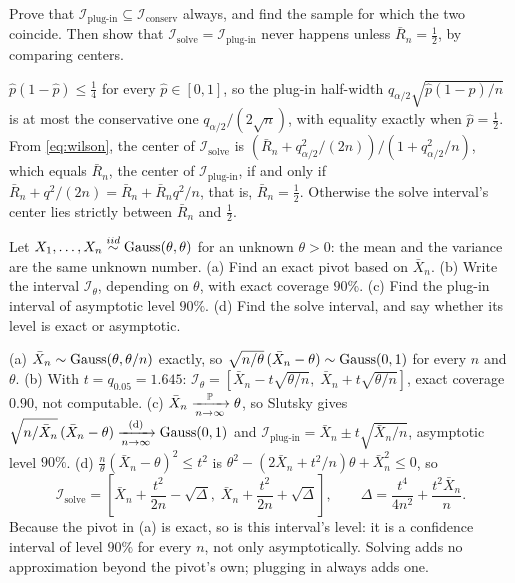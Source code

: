 \begin{exercise}
\label{ex:ci-nesting}
Prove that $\mathcal{I}_{\text{plug-in}} \subseteq \mathcal{I}_{\text{conserv}}$ always, and find the sample for which the two coincide. Then show that $\mathcal{I}_{\text{solve}} = \mathcal{I}_{\text{plug-in}}$ never happens unless $\bar{R}_n = \frac12$, by comparing centers.
\end{exercise}
\begin{solution}
$\hat{p}(1 - \hat{p}) \leq \frac14$ for every $\hat{p} \in [0,1]$, so the plug-in half-width $q_{\alpha/2}\sqrt{\hat{p}(1-\hat{p})/n}$ is at most the conservative one $q_{\alpha/2}/(2\sqrt{n})$, with equality exactly when $\hat{p} = \frac12$. From \cref{eq:wilson}, the center of $\mathcal{I}_{\text{solve}}$ is $(\bar{R}_n + q_{\alpha/2}^2/(2n))/(1 + q_{\alpha/2}^2/n)$, which equals $\bar{R}_n$, the center of $\mathcal{I}_{\text{plug-in}}$, if and only if $\bar{R}_n + q^2/(2n) = \bar{R}_n + \bar{R}_n q^2/n$, that is, $\bar{R}_n = \frac12$. Otherwise the solve interval's center lies strictly between $\bar{R}_n$ and $\frac12$.
\end{solution}

\begin{exercise}
\label{ex:ci-curved}
Let $X_1, \ldots, X_n \stackrel{iid}{\sim} \text{Gauss}(\theta, \theta)$ for an unknown $\theta > 0$: the mean and the variance are the same unknown number. (a) Find an exact pivot based on $\bar{X}_n$. (b) Write the interval $\mathcal{I}_\theta$, depending on $\theta$, with exact coverage $90\%$. (c) Find the plug-in interval of asymptotic level $90\%$. (d) Find the solve interval, and say whether its level is exact or asymptotic.
\end{exercise}
\begin{solution}
(a) $\bar{X}_n \sim \text{Gauss}(\theta, \theta/n)$ exactly, so $\sqrt{n/\theta}\,(\bar{X}_n - \theta) \sim \text{Gauss}(0,1)$ for every $n$ and $\theta$. (b) With $t = q_{0.05} = 1.645$: $\mathcal{I}_\theta = [\bar{X}_n - t\sqrt{\theta/n}, \; \bar{X}_n + t\sqrt{\theta/n}]$, exact coverage $0.90$, not computable. (c) $\bar{X}_n \xrightarrow [n \to \infty ]{\mathbb{P}} \theta$, so Slutsky gives $\sqrt{n/\bar{X}_n}\,(\bar{X}_n - \theta) \xrightarrow [n \to \infty ]{\text{(d)}} \text{Gauss}(0,1)$ and $\mathcal{I}_{\text{plug-in}} = \bar{X}_n \pm t\sqrt{\bar{X}_n/n}$, asymptotic level $90\%$. (d) $\frac{n}{\theta}(\bar{X}_n - \theta)^2 \leq t^2$ is $\theta^2 - (2\bar{X}_n + t^2/n)\theta + \bar{X}_n^2 \leq 0$, so
\[
\mathcal{I}_{\text{solve}} = \left[ \bar{X}_n + \frac{t^2}{2n} - \sqrt{\Delta}, \; \bar{X}_n + \frac{t^2}{2n} + \sqrt{\Delta} \right], \qquad \Delta = \frac{t^4}{4n^2} + \frac{t^2 \bar{X}_n}{n}.
\]
Because the pivot in (a) is exact, so is this interval's level: it is a confidence interval of level $90\%$ for every $n$, not only asymptotically. Solving adds no approximation beyond the pivot's own; plugging in always adds one.
\end{solution}


